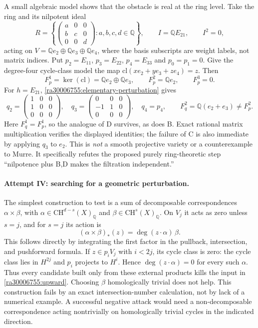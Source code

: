 \documentclass[11pt]{article}
\newcommand{\Q}{\mathbb{Q}}
\begin{document}
A small algebraic model shows that the obstacle is real at the ring level.
Take the ring and its nilpotent ideal
\[
 R=\left\{\begin{pmatrix}a&0&0\\ b&c&0\\0&0&d\end{pmatrix}:a,b,c,d\in\Q\right\},
 \qquad I=\Q E_{21},\qquad I^2=0,
\]
acting on $V=\Q e_2\oplus\Q e_3\oplus\Q e_4$, where the basis subscripts are
weight labels, not matrix indices.  Put $p_2=E_{11}$, $p_3=E_{22}$,
$p_4=E_{33}$ and $p_0=p_1=0$.  Give the degree-four cycle-class model the map
$\mathrm{cl}(x e_2+y e_3+z e_4)=z$.  Then
\[
 F_p^1=\ker(\mathrm{cl})=\Q e_2\oplus\Q e_3,
 \qquad F_p^2=\Q e_2,
 \qquad F_p^3=0.
\]
For $h=E_{21}$, \eqref{ra30006755:elementary-perturbation} gives
\[
 q_2=\begin{pmatrix}1&0&0\\1&0&0\\0&0&0\end{pmatrix},\quad
 q_3=\begin{pmatrix}0&0&0\\-1&1&0\\0&0&0\end{pmatrix},\quad q_4=p_4,
 \qquad F_q^2=\Q(e_2+e_3)\ne F_p^2.
\]
Here $F_q^1=F_p^1$, so the analogue of D survives, as does B.  Exact rational
matrix multiplication verifies the displayed identities; the failure of C
is also immediate by applying $q_3$ to $e_2$.
This is \emph{not} a smooth projective variety or a counterexample to Murre.
It specifically refutes the proposed purely ring-theoretic step
``nilpotence plus B,D makes the filtration independent.''

\paragraph{Attempt IV: searching for a geometric perturbation.}
The simplest construction to test is a sum of decomposable correspondences
$\alpha\times\beta$, with
$\alpha\in\mathrm{CH}^{d-s}(X)_{\Q}$ and
$\beta\in\mathrm{CH}^{s}(X)_{\Q}$.  On $V_j$ it acts as zero unless $s=j$,
and for $s=j$ its action is
\begin{equation}\label{ra30006755:rank-one}
 (\alpha\times\beta)_*(z)=\deg(z\cdot\alpha)\,\beta.
\end{equation}
This follows directly by integrating the first factor in the pullback,
intersection, and pushforward formula.  If $z\in p_iV_j$ with $i<2j$, its
cycle class is zero: the cycle class lies in $H^{2j}$ and $p_i$ projects to
$H^i$.  Hence $\deg(z\cdot\alpha)=0$ for every such $\alpha$.  Thus every
candidate built only from these external products kills the input in
\eqref{ra30006755:upward}.  Choosing $\beta$ homologically trivial does not help.
This construction fails by an exact intersection-number calculation, not by
lack of a numerical example.  A successful negative attack would need a
non-decomposable correspondence acting nontrivially on homologically trivial
cycles in the indicated direction.
\end{document}
